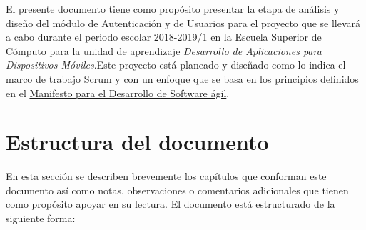 El presente documento tiene como propósito presentar la etapa de análisis y diseño del módulo de Autenticación y de Usuarios para el proyecto que se llevará a cabo durante el periodo escolar 2018-2019/1 en la Escuela Superior de Cómputo para la unidad de aprendizaje \textit{Desarrollo de Aplicaciones para Dispositivos Móviles}.Este proyecto está planeado y diseñado como lo indica el marco de trabajo Scrum y con un enfoque que se basa en los principios definidos en el \href{http://agilemanifesto.org}{Manifesto para el Desarrollo de Software ágil}.

\section{Estructura del documento}

En esta sección se describen brevemente los capítulos que conforman este documento así como notas, observaciones o comentarios adicionales que tienen como propósito apoyar en su lectura. El documento está estructurado de la siguiente forma:

